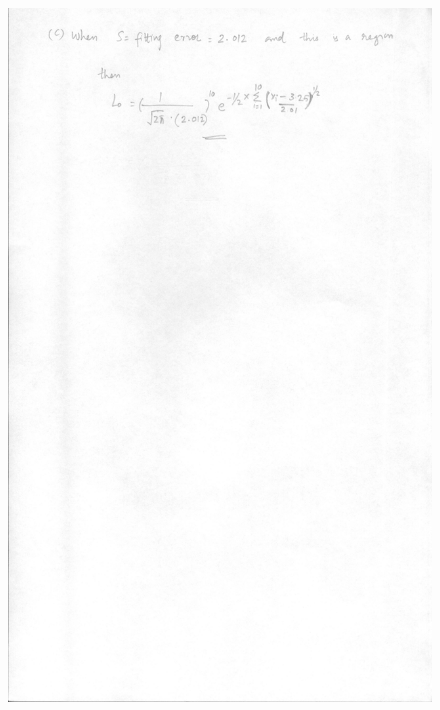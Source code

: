 \documentclass{article}
\begin{document}
\begin{figure}
\includegraphics[width=15cm]{qn7_2.jpg}
\end{figure}
\end{document}
